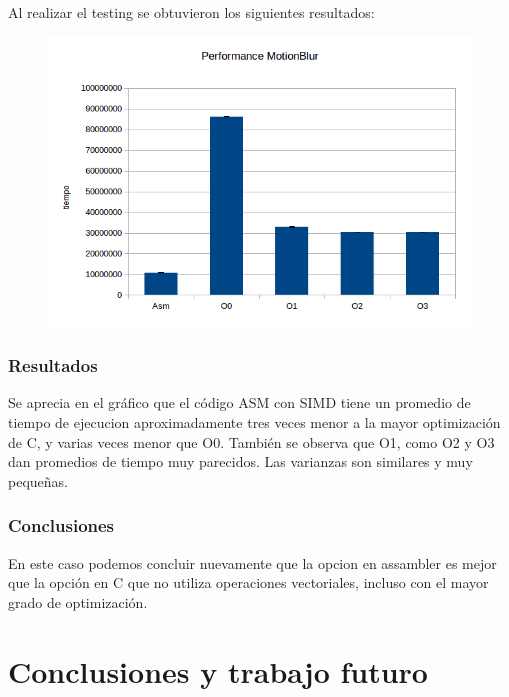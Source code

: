 \documentclass[a4paper]{article}
\begin{document}
Al realizar el testing se obtuvieron los siguientes resultados:

\newpage

\begin{figure}[h!]
  \begin{center}
  \includegraphics[scale=0.66]{Graficos1.4/mbl/per.jpg}
  \label{nombreparareferenciar11}
  \end{center}
\end{figure}

\subsubsection{Resultados}
Se aprecia en el gráfico que el código ASM con SIMD tiene un promedio de tiempo de ejecucion aproximadamente tres veces menor a la mayor optimización de C, y varias veces menor que O0. También se observa que O1, como O2 y O3 dan promedios de tiempo muy parecidos. Las varianzas son similares y muy pequeñas.

\subsubsection{Conclusiones}

En este caso podemos concluir nuevamente que la opcion en assambler es mejor que la opción en C que no utiliza operaciones vectoriales, incluso con el mayor grado de optimización.

\newpage
\section{Conclusiones y trabajo futuro}
\end{document}
